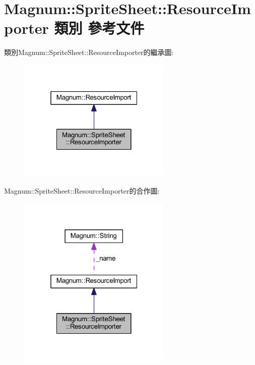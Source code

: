 \hypertarget{class_magnum_1_1_sprite_sheet_1_1_resource_importer}{}\section{Magnum\+:\+:Sprite\+Sheet\+:\+:Resource\+Importer 類別 參考文件}
\label{class_magnum_1_1_sprite_sheet_1_1_resource_importer}


類別\+Magnum\+:\+:Sprite\+Sheet\+:\+:Resource\+Importer的繼承圖\+:\nopagebreak
\begin{figure}[H]
\begin{center}
\leavevmode
\includegraphics[width=208pt]{class_magnum_1_1_sprite_sheet_1_1_resource_importer__inherit__graph}
\end{center}
\end{figure}


Magnum\+:\+:Sprite\+Sheet\+:\+:Resource\+Importer的合作圖\+:\nopagebreak
\begin{figure}[H]
\begin{center}
\leavevmode
\includegraphics[width=208pt]{class_magnum_1_1_sprite_sheet_1_1_resource_importer__coll__graph}
\end{center}
\end{figure}
